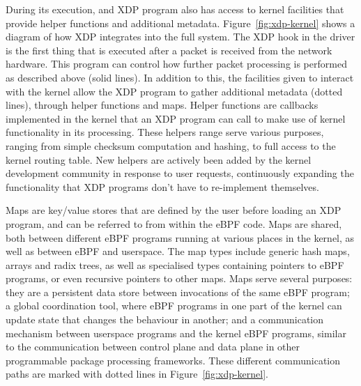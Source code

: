 \documentclass[10pt,sigconf]{acmart}
\begin{document}
During its execution, and XDP program also has access to kernel facilities that
provide helper functions and additional metadata. Figure~\ref{fig:xdp-kernel}
shows a diagram of how XDP integrates into the full system. The XDP hook in the
driver is the first thing that is executed after a packet is received from the
network hardware. This program can control how further packet processing is
performed as described above (solid lines). In addition to this, the facilities
given to interact with the kernel allow the XDP program to gather additional
metadata (dotted lines), through helper functions and maps. Helper functions are
callbacks implemented in the kernel that an XDP program can call to make use of
kernel functionality in its processing. These helpers range serve various
purposes, ranging from simple checksum computation and hashing, to full access
to the kernel routing table. New helpers are actively been added by the kernel
development community in response to user requests, continuously expanding the
functionality that XDP programs don't have to re-implement themselves.

Maps are key/value stores that are defined by the user before loading an XDP
program, and can be referred to from within the eBPF code. Maps are shared, both
between different eBPF programs running at various places in the kernel, as well
as between eBPF and userspace. The map types include generic hash maps, arrays
and radix trees, as well as specialised types containing pointers to eBPF
programs, or even recursive pointers to other maps. Maps serve several purposes:
they are a persistent data store between invocations of the same eBPF program; a
global coordination tool, where eBPF programs in one part of the kernel can
update state that changes the behaviour in another; and a communication
mechanism between userspace programs and the kernel eBPF programs, similar to
the communication between control plane and data plane in other programmable
package processing frameworks. These different communication paths are marked
with dotted lines in Figure~\ref{fig:xdp-kernel}.
\end{document}
